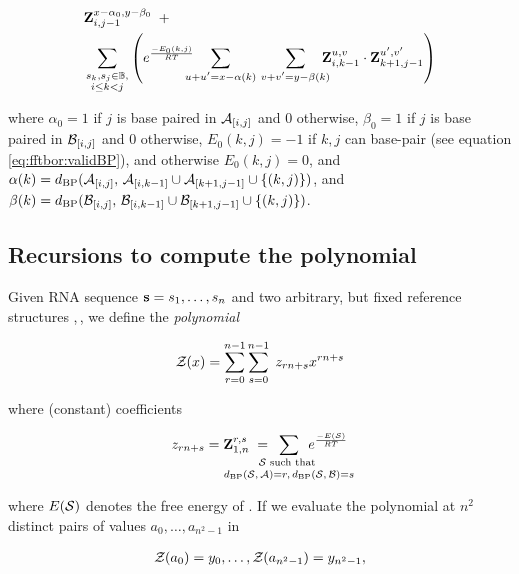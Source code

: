 \begin{align}
\label{eq:ffttwo:bfZabij}
\begin{split}
& \bfZ{x-\alpha_0,y-\beta_0}{i,j-1}\enspace + \\
& \sum_{\substack{s_k,s_j \in \bpSet, \\ i \le k<j}}
\left(
\boltzNuss{k,j}\quad
\sum_{\mathclap{u+u'=x-\alpha(k)}}\hspace{3.75em}
\sum_{\mathclap{v+v'=y-\beta(k)}}\quad
\bfZ{u,v}{i,k-1} \cdot \bfZ{u',v'}{k+1,j-1}
\right)
\end{split}
\end{align}

where $\alpha_0 = 1$ if $j$ is base paired in $\mathcal A_{[i,j]}$ and $0$ otherwise,
$\beta_0 = 1$ if $j$ is base paired in $\mathcal B_{[i,j]}$ and $0$ otherwise,
$E_0(k,j)=-1$ if $k,j$ can base-pair
(see equation \ref{eq:fftbor:validBP}), and otherwise $E_0(k,j)=0$, and
$\alpha(k) =
d_{\text{BP}}(\mathcal A_{[i,j]},\,\mathcal A_{[i,k-1]} \cup \mathcal A_{[k+1,j-1]} \cup \{ (k,j) \})$,
and
$\beta(k) =
d_{\text{BP}}(\mathcal B_{[i,j]},\,\mathcal B_{[i,k-1]} \cup \mathcal B_{[k+1,j-1]} \cup \{ (k,j) \})$.

\subsection{Recursions to compute the polynomial
\texorpdfstring{}{}}
\label{subsec:ffttwo:polynomial}

Given RNA sequence ${\bf s} = s_1,\dots,s_n$
and two arbitrary, but fixed reference
structures \strA,\,\strB, we define the {\em polynomial}

\begin{align}
\label{eq:ffttwo:zOfX}
\emZ{} = \sum_{r=0}^{n-1} \sum_{s=0}^{n-1}\; z_{rn+s} x^{rn+s}
\end{align}

where (constant) coefficients

\begin{align}
z_{rn+s} = \bfZ{r,s}{1,n}\;=
\enspace\sum_{\mathclap{\substack{
\str \text{ such that } \rule[-.5ex]{0pt}{0pt} \\
\dBP{\str}{\strA} = r,\,\dBP{\str}{\strB} = s
}}}\enspace
\boltzF{\str}
\end{align}

where $E(\mathcal S)$ denotes the free energy of \str.
If we evaluate the polynomial \emZ{} at $n^2$ distinct pairs of values
$a_0,\dots,a_{n^2-1}$ in

\begin{align}
\label{eq:ffttwo:solutionsForAlpha}
\emZof{}{a_0} = y_{0}, \dots, \emZof{}{a_{n^2-1}} = y_{n^2-1},
\end{align}


